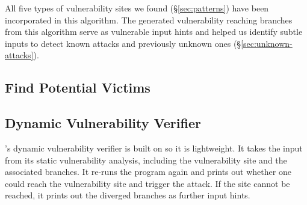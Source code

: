 
All five types of vulnerability sites we found (\S\ref{sec:patterns}) have
been incorporated in this algorithm. The generated vulnerability reaching branches
from this algorithm serve as vulnerable input hints and helped us identify
subtle inputs to detect \nknownVul known attacks and \nunknownVul previously
unknown ones (\S\ref{sec:unknown-attacks}).

\subsection{Find Potential Victims}




\subsection{Dynamic Vulnerability Verifier}

\xxx's dynamic vulnerability verifier is built on \lldb so it is lightweight. 
It takes the input from its static vulnerability analysis, including the 
vulnerability site and the associated branches. It re-runs the program  again 
and prints out whether one could reach the vulnerability site and trigger the 
attack. If the site cannot be reached, it prints out the diverged branches as 
further input hints.